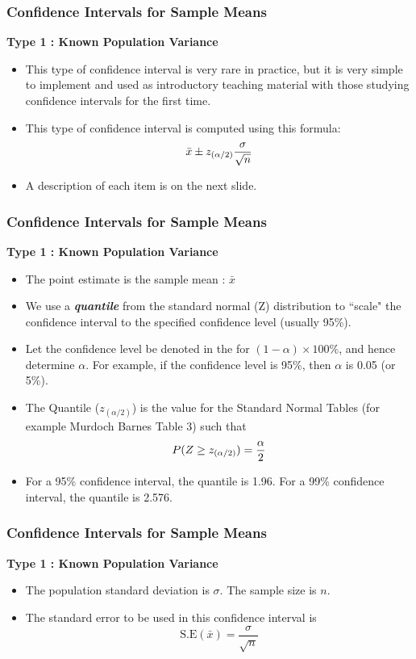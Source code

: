 \begin{frame}
\frametitle{Confidence Intervals for Sample Means}
\textbf{Type 1 : Known Population Variance}\\
\begin{itemize}
\item This type of confidence interval is very rare in practice, but it is very simple to implement and used as introductory
teaching material with those studying confidence intervals for the first time.
\item This type of confidence interval is computed using this formula:
\[ \bar{x} \pm z_{(\alpha/2)}{\sigma \over \sqrt{n}} \]
\item A description of each item is on the next slide.
\end{itemize}
\end{frame}


\begin{frame}
\frametitle{Confidence Intervals for Sample Means}
\textbf{Type 1 : Known Population Variance}\\
\begin{itemize}

\item The point estimate is the sample mean : $\bar{x}$

\item We use a \textbf{\textit{quantile}} from the standard normal (Z) distribution to ``scale"
the confidence interval to the specified confidence level (usually 95\%).

\item Let the confidence level be denoted in the for $(1-\alpha)\times 100\%$, and hence determine $\alpha$.
For example, if the confidence level is 95\%, then $\alpha$ is 0.05 (or 5\%).

\item The Quantile ($z_{(\alpha/2)}$) is the value for the Standard Normal Tables (for example Murdoch Barnes Table 3) such that
\[ P(Z \geq z_{(\alpha/2)}) = {\alpha \over 2}\]

\item For a 95\% confidence interval, the quantile is 1.96. For a 99\% confidence interval, the quantile is 2.576.
\end{itemize}
\end{frame}
\begin{frame}
\frametitle{Confidence Intervals for Sample Means}
\textbf{Type 1 : Known Population Variance}\\
\begin{itemize}

\item The population standard deviation is $\sigma$. The sample size is $n$.
\item The standard error to be used in this confidence interval is
\[ \mbox{S.E}(\bar{x}) = \frac{\sigma}{\sqrt{n}}\]

\end{itemize}
\end{frame}


